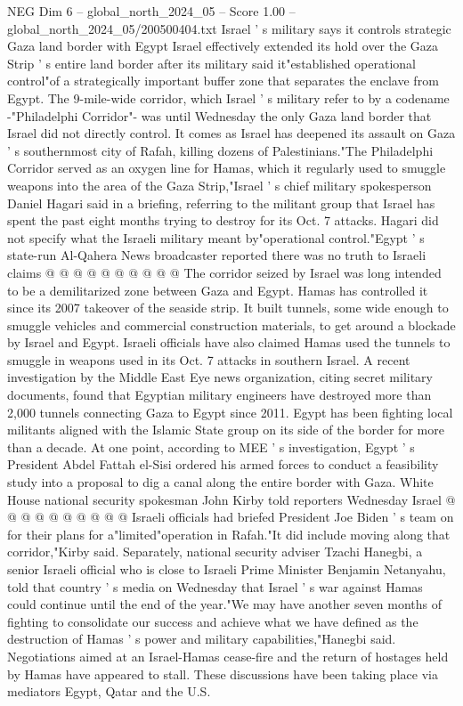 \begin{textsample}{NEG Dim 6 – global\_north\_2024\_05 – Score 1.00 – global\_north\_2024\_05/200500404.txt}  \label{ex:f6_neg_295}
Israel ' s military says it controls strategic Gaza land border with Egypt Israel effectively extended its hold over the Gaza Strip ' s entire land border after its military said it"established operational control"of a strategically important buffer zone that separates the enclave from Egypt.
The 9-mile-wide corridor, which Israel ' s military refer to by a codename -"Philadelphi Corridor"- was until Wednesday the only Gaza land border that Israel did not directly control.
It comes as Israel has deepened its assault on Gaza ' s southernmost city of Rafah, killing dozens of Palestinians."The Philadelphi Corridor served as an oxygen line for Hamas, which it regularly used to smuggle weapons into the area of the Gaza Strip,"Israel ' s chief military spokesperson Daniel Hagari said in a briefing, referring to the militant group that Israel has spent the past eight months trying to destroy for its Oct. 7 attacks.
Hagari did not specify what the Israeli military meant by"operational control."Egypt ' s state-run Al-Qahera News broadcaster reported there was no truth to Israeli claims @ @ @ @ @ @ @ @ @ @ The corridor seized by Israel was long intended to be a demilitarized zone between Gaza and Egypt.
Hamas has controlled it since its 2007 takeover of the seaside strip.
It built tunnels, some wide enough to smuggle vehicles and commercial construction materials, to get around a blockade by Israel and Egypt.
Israeli officials have also claimed Hamas used the tunnels to smuggle in weapons used in its Oct. 7 attacks in southern Israel.
A recent investigation by the Middle East Eye news organization, citing secret military documents, found that Egyptian military engineers have destroyed more than 2,000 tunnels connecting Gaza to Egypt since 2011.
Egypt has been fighting local militants aligned with the Islamic State group on its side of the border for more than a decade.
At one point, according to MEE ' s investigation, Egypt ' s President Abdel Fattah el-Sisi ordered his armed forces to conduct a feasibility study into a proposal to dig a canal along the entire border with Gaza.
White House national security spokesman John Kirby told reporters Wednesday Israel @ @ @ @ @ @ @ @ @ @ Israeli officials had briefed President Joe Biden ' s team on for their plans for a"limited"operation in Rafah."It did include moving along that corridor,"Kirby said.
Separately, national security adviser Tzachi Hanegbi, a senior Israeli official who is close to Israeli Prime Minister Benjamin Netanyahu, told that country ' s media on Wednesday that Israel ' s war against Hamas could continue until the end of the year."We may have another seven months of fighting to consolidate our success and achieve what we have defined as the destruction of Hamas ' s power and military capabilities,"Hanegbi said.
Negotiations aimed at an Israel-Hamas cease-fire and the return of hostages held by Hamas have appeared to stall.
These discussions have been taking place via mediators Egypt, Qatar and the U.S.

\end{textsample}
